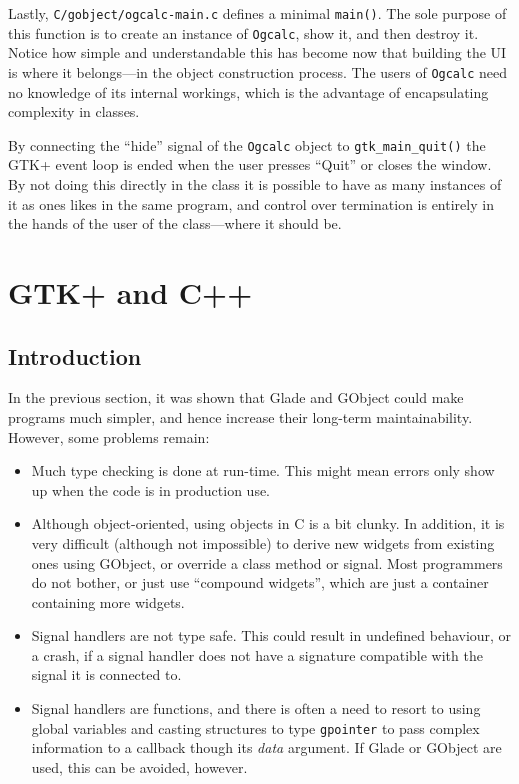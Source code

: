 \documentclass[a4paper,oneside]{article}
\newcommand{\filename}[1]{\texttt{#1}}
\newcommand{\variable}[1]{\textsl{#1}}
\newcommand{\class}[1]{\texttt{#1}}
\newcommand{\function}[1]{\texttt{#1()}}
\newcommand{\type}[1]{\texttt{#1}}
\begin{document}
Lastly, \filename{C/gobject/ogcalc-main.c} defines a minimal
\function{main}.  The sole purpose of this function is to create an
instance of \class{Ogcalc}, show it, and then destroy it.  Notice how
simple and understandable this has become now that building the UI is
where it belongs---in the object construction process.  The users of
\class{Ogcalc} need no knowledge of its internal workings, which is
the advantage of encapsulating complexity in classes.

By connecting the ``hide'' signal of the \class{Ogcalc} object to
\function{gtk\_main\_quit} the GTK+ event loop is ended when the user
presses ``Quit'' or closes the window.  By not doing this directly in
the class it is possible to have as many instances of it as ones likes
in the same program, and control over termination is entirely in the
hands of the user of the class---where it should be.


\section{GTK+ and C++}

\label{sec:cxxglade}

\subsection{Introduction}

In the previous section, it was shown that Glade and GObject could
make programs much simpler, and hence increase their long-term
maintainability.  However, some problems remain:

\begin{itemize}
\item Much type checking is done at run-time.  This might mean errors
  only show up when the code is in production use.
\item Although object-oriented, using objects in C is a bit clunky.
  In addition, it is very difficult (although not impossible) to
  derive new widgets from existing ones using GObject, or override a
  class method or signal.  Most programmers do not bother, or just use
  ``compound widgets'', which are just a container containing more
  widgets.
\item Signal handlers are not type safe.  This could result in
  undefined behaviour, or a crash, if a signal handler does not have a
  signature compatible with the signal it is connected to.
\item Signal handlers are functions, and there is often a need to
  resort to using global variables and casting structures to type
  \type{gpointer} to pass complex information to a callback though its
  \variable{data} argument.  If Glade or GObject are used, this can be
  avoided, however.
\end{itemize}
\end{document}

